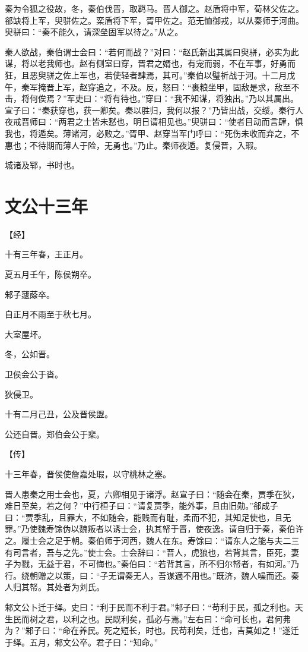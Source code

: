 \documentclass[a4paper,12pt,UTF8,twoside]{ctexbook}
\begin{document}
秦为令狐之役故，冬，秦伯伐晋，取羁马。晋人御之。赵盾将中军，荀林父佐之。郤缺将上军，臾骈佐之。栾盾将下军，胥甲佐之。范无恤御戎，以从秦师于河曲。臾骈曰：“秦不能久，请深垒固军以待之。”从之。

秦人欲战，秦伯谓士会曰：“若何而战？”对曰：“赵氏新出其属曰臾骈，必实为此谋，将以老我师也。赵有侧室曰穿，晋君之婿也，有宠而弱，不在军事，好勇而狂，且恶臾骈之佐上军也，若使轻者肆焉，其可。”秦伯以璧祈战于河。十二月戊午，秦军掩晋上军，赵穿追之，不及。反，怒曰：“裹粮坐甲，固敌是求，敌至不击，将何俟焉？”军吏曰：“将有待也。”穿曰：“我不知谋，将独出。”乃以其属出。宣子曰：“秦获穿也，获一卿矣。秦以胜归，我何以报？”乃皆出战，交绥。秦行人夜戒晋师曰：“两君之士皆未慭也，明日请相见也。”臾骈曰：“使者目动而言肆，惧我也，将遁矣。薄诸河，必败之。”胥甲、赵穿当军门呼曰：“死伤未收而弃之，不惠也；不待期而薄人于险，无勇也。”乃止。秦师夜遁。复侵晋，入瑕。

城诸及郓，书时也。


\section{文公十三年}


【经】

十有三年春，王正月。

夏五月壬午，陈侯朔卒。

邾子蘧蒢卒。

自正月不雨至于秋七月。

大室屋坏。

冬，公如晋。

卫侯会公于沓。

狄侵卫。

十有二月己丑，公及晋侯盟。

公还自晋。郑伯会公于棐。

【传】

十三年春，晋侯使詹嘉处瑕，以守桃林之塞。

晋人患秦之用士会也，夏，六卿相见于诸浮。赵宣子曰：“随会在秦，贾季在狄，难日至矣，若之何？”中行桓子曰：“请复贾季，能外事，且由旧勋。”郤成子曰：“贾季乱，且罪大，不如随会，能贱而有耻，柔而不犯，其知足使也，且无罪。”乃使魏寿馀伪以魏叛者以诱士会，执其帑于晋，使夜逸。请自归于秦，秦伯许之。履士会之足于朝。秦伯师于河西，魏人在东。寿馀曰：“请东人之能与夫二三有司言者，吾与之先。”使士会。士会辞曰：“晋人，虎狼也，若背其言，臣死，妻子为戮，无益于君，不可悔也。”秦伯曰：“若背其言，所不归尔帑者，有如河。”乃行。绕朝赠之以策，曰：“子无谓秦无人，吾谋適不用也。”既济，魏人噪而还。秦人归其帑。其处者为刘氏。

邾文公卜迁于绎。史曰：“利于民而不利于君。”邾子曰：“苟利于民，孤之利也。天生民而树之君，以利之也。民既利矣，孤必与焉。”左右曰：“命可长也，君何弗为？”邾子曰：“命在养民。死之短长，时也。民苟利矣，迁也，吉莫如之！”遂迁于绎。五月，邾文公卒。君子曰：“知命。”
\end{document}
